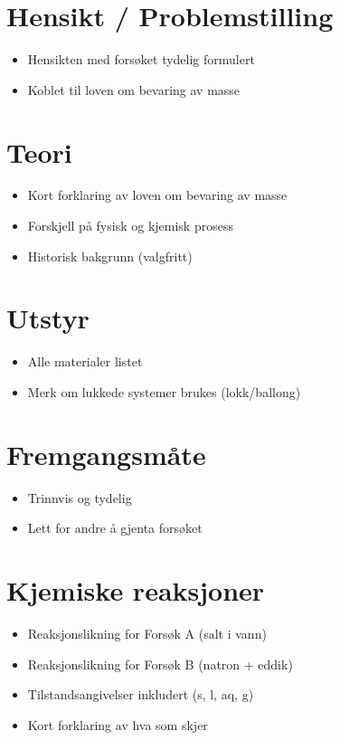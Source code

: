 \documentclass[a4paper,12pt]{article}
\begin{document}
\section*{Hensikt / Problemstilling}
\begin{itemize}
    \item Hensikten med forsøket tydelig formulert
    \item Koblet til loven om bevaring av masse
\end{itemize}

\section*{Teori}
\begin{itemize}
    \item Kort forklaring av loven om bevaring av masse
    \item Forskjell på fysisk og kjemisk prosess
    \item Historisk bakgrunn (valgfritt)
\end{itemize}

\section*{Utstyr}
\begin{itemize}
    \item Alle materialer listet
    \item Merk om lukkede systemer brukes (lokk/ballong)
\end{itemize}

\section*{Fremgangsmåte}
\begin{itemize}
    \item Trinnvis og tydelig
    \item Lett for andre å gjenta forsøket
\end{itemize}

\section*{Kjemiske reaksjoner}
\begin{itemize}
    \item Reaksjonslikning for Forsøk A (salt i vann)
    \item Reaksjonslikning for Forsøk B (natron + eddik)
    \item Tilstandsangivelser inkludert (s, l, aq, g)
    \item Kort forklaring av hva som skjer
\end{itemize}
\end{document}
